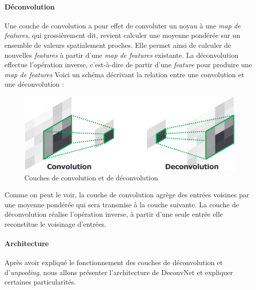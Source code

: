 \documentclass[a4paper, 11pt]{report}
\begin{document}
\paragraph{Déconvolution}
Une couche de convolution a pour effet de convoluter un noyau à une \emph{map de  features}, qui grossièrement dit, revient calculer une moyenne pondérée sur un ensemble de valeurs spatialement proches.
Elle permet ainsi de calculer de nouvelles \emph{features} à partir d'une \emph{map de features} existante.
La déconvolution effectue l'opération inverse, c'est-à-dire de partir d'une \emph{feature} pour produire une \emph{map de features}
Voici un schéma décrivant la relation entre une convolution et une déconvolution :
\begin{figure}[H]
	\begin{center}
		\includegraphics[scale=0.3]{Images/Deconvolution.png}
		\caption{Couches de convolution et de déconvolution}
	\end{center}
\end{figure}
Comme on peut le voir, la couche de convolution agrège des entrées voisines par une moyenne pondérée qui sera transmise à la couche suivante.
La couche de déconvolution réalise l'opération inverse, à partir d'une seule entrée elle reconstitue le voisinage d'entrées.

\paragraph{Architecture}
Après avoir expliqué le fonctionnement des couches de déconvolution et d'\emph{unpooling}, nous allons présenter l'architecture de DeconvNet et expliquer certaines particularités.
\end{document}
